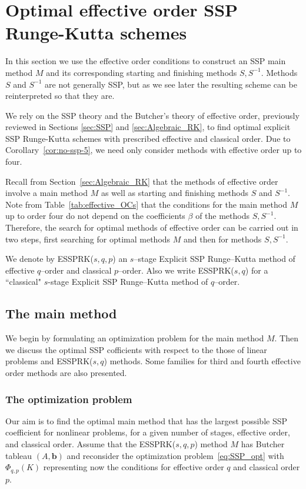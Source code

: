 \section{Optimal effective order SSP Runge-Kutta schemes}\label{sec:optimal_ESSPRK}
In this section we use the effective order conditions to construct an SSP main method $M$ and 
its corresponding starting and finishing methods $S, S^{-1}$. 
Methods $S$ and $S^{-1}$ are not generally SSP, but as we see later the resulting scheme can 
be reinterpreted so that they are.

We rely on the SSP theory and the Butcher's theory of effective order, previously reviewed in 
Sections \ref{sec:SSP} and \ref{sec:Algebraic_RK}, to find optimal explicit SSP Runge-Kutta 
schemes with prescribed effective and classical order. 
Due to Corollary~\ref{cor:no-ssp-5}, we need only consider methods with effective order up 
to four.

Recall from Section~\ref{sec:Algebraic_RK} that the methods of effective order involve a main 
method $M$ as well as starting and finishing methods $S$ and $S^{-1}$.
Note from Table~\ref{tab:effective_OCs} that the conditions for the main method $M$ up to 
order four do not depend on the coefficients $\beta$ of the methods $S, S^{-1}$. 
Therefore, the search for optimal methods of effective order can be carried out in two steps, 
first searching for optimal methods $M$ and then for methods $S, S^{-1}$.

We denote by ESSPRK($s,q,p$) an $s$--stage Explicit SSP Runge--Kutta method of effective 
$q$--order and classical $p$--order. 
Also we write ESSPRK($s,q$) for a ``classical" $s$-stage Explicit SSP Runge--Kutta method of 
$q$--order.

\subsection{The main method}\label{subsec:main_method}
We begin by formulating an optimization problem for the main method $M$. 
Then we discuss the optimal SSP cofficients with respect to the those of linear problems and 
ESSPRK($s,q$) methods. Some families for third and fourth effective order methods are also 
presented.

\subsubsection{The optimization problem}\label{subsubsec:opt_problem}
Our aim is to find the optimal main method that has the largest possible SSP coefficient for 
nonlinear problems, for a given number of stages, effective order, and classical order. 
Assume that the ESSPRK($s,q,p$) method $M$ has Butcher tableau  $(A, \bm{b})$ and 
reconsider the optimization problem~\eqref{eq:SSP_opt} with $\Phi_{q,p}(K)$ representing 
now the conditions for effective order $q$ and classical order $p$.


